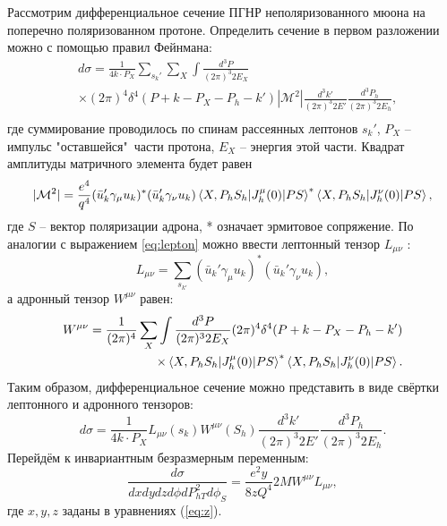 \documentclass{extarticle}
\begin{document}
Рассмотрим дифференциальное сечение ПГНР неполяризованного мюона на поперечно поляризованном протоне. Определить сечение в первом разложении можно с помощью правил Фейнмана:
\begin{equation}
\begin{split}
	& d\sigma = \frac{1}{4k\cdot P_X} \sum_{s_k'} \sum_X \int \frac{d^3 P}{(2\pi)^3 2 E_X} \\
	& \times (2\pi)^4 \delta^4(P+k-P_X - P_h - k')|\mathcal{M}^2| \frac{d^3 k'}{(2\pi)^3 2E'}\frac{d^3 P_h}{(2\pi)^3 2E_h}, \\
\end{split}
\end{equation}
где суммирование проводилось по спинам рассеянных лептонов $s_k'$, $P_X$ -- импульс "оставшейся"\ части протона, $E_X$ -- энергия этой части. Квадрат амплитуды матричного элемента будет равен
\begin{equation}
		|\mathcal{M}^2| = \frac{e^4}{q^4} (\bar{u}_k'\gamma_\mu u_k)^{*}(\bar{u}_k'\gamma_\nu u_k)  \braket{X, P_h S_h | J_h^\mu (0) | PS}^{*} \braket{X, P_h S_h | J_h^\nu (0) | PS},
\end{equation}
где $S$ -- вектор поляризации адрона, * означает эрмитовое сопряжение. По аналогии с выражением \ref{eq:lepton} можно ввести лептонный тензор $L_{\mu \nu}$ \cite{Barone_2002}:
\begin{equation}
	L_{\mu \nu} = \sum_{s_{k'}} (\bar{u}_k'\gamma_\mu u_k)^{*}(\bar{u}_k'\gamma_\nu u_k),
\end{equation}
а адронный тензор $W^{\mu \nu}$ равен:
\begin{equation}
	\begin{split}
		W^{\mu \nu} = \frac{1}{(2\pi)^4} \sum_X \int \frac{d^3 P}{(2\pi)^3 2 E_X} (2\pi)^4 \delta^4(P+k-P_X - P_h - k') \\
		\times \braket{X, P_h S_h | J_h^\mu (0) | PS}^{*} \braket{X, P_h S_h | J_h^\nu (0) | PS}.
	\end{split}
\end{equation}
Таким образом, дифференциальное сечение можно представить в виде свёртки лептонного и адронного тензоров:
\begin{equation}
	d\sigma = \frac{1}{4k\cdot P_X} L_{\mu\nu}(s_k) W^{\mu \nu}(S_h) \frac{d^3 k'}{(2\pi)^3 2E'}\frac{d^3 P_h}{(2\pi)^3 2E_h}.
\end{equation}
Перейдём к инвариантным безразмерным переменным:
\begin{equation}
	\frac{d\sigma}{dxdydzd\phi dP^2_{hT}d\phi_S} = \frac{e^2 y}{8zQ^4}2MW^{\mu\nu}L_{\mu\nu},
\end{equation}
где $x,y,z$ заданы в уравнениях (\ref{eq:z}).
\end{document}
